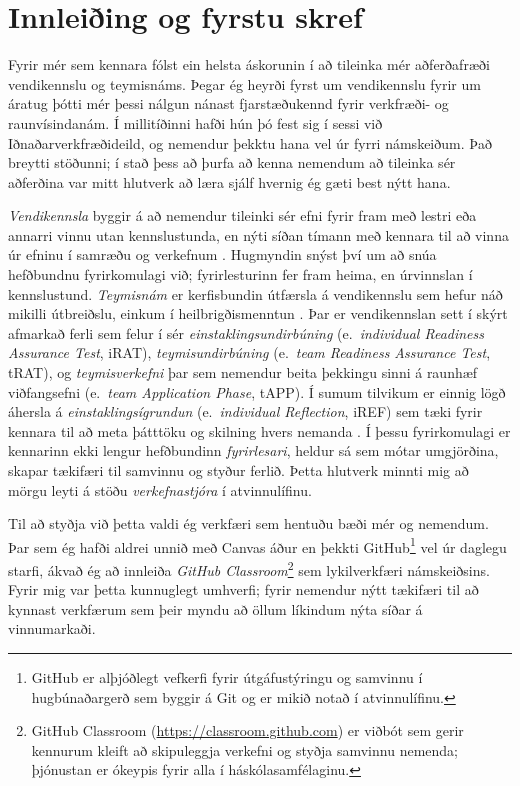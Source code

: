 \documentclass{article}
\begin{document}
\section*{Innleiðing og fyrstu skref}
Fyrir mér sem kennara fólst ein helsta áskorunin í að tileinka mér aðferðafræði vendikennslu og teymisnáms. Þegar ég heyrði fyrst um vendikennslu fyrir um áratug þótti mér þessi nálgun nánast fjarstæðukennd fyrir verkfræði- og raunvísindanám. Í millitíðinni hafði hún þó fest sig í sessi við Iðnaðarverkfræðideild, og nemendur þekktu hana vel úr fyrri námskeiðum. Það breytti stöðunni; í stað þess að þurfa að kenna nemendum að tileinka sér aðferðina var mitt hlutverk að læra sjálf hvernig ég gæti best nýtt hana.

\textit{Vendikennsla} byggir á að nemendur tileinki sér efni fyrir fram með lestri eða annarri vinnu utan kennslustunda, en nýti síðan tímann með kennara til að vinna úr efninu í samræðu og verkefnum \citep{tucker2012flipped}. Hugmyndin snýst því um að snúa hefðbundnu fyrirkomulagi við; fyrirlesturinn fer fram heima, en úrvinnslan í kennslustund.
\textit{Teymisnám} er kerfisbundin útfærsla á vendikennslu sem hefur náð mikilli útbreiðslu, einkum í heilbrigðismenntun \citep{michaelsen2004team}. Þar er vendikennslan sett í skýrt afmarkað ferli sem felur í sér \textit{einstaklingsundirbúning} (e.~\textit{individual Readiness Assurance Test}, iRAT), \textit{teymisundirbúning} (e.~\textit{team Readiness Assurance Test}, tRAT), og \textit{teymisverkefni} þar sem nemendur beita þekkingu sinni á raunhæf viðfangsefni (e.~\textit{team Application Phase}, tAPP). Í sumum tilvikum er einnig lögð áhersla á \textit{einstaklingsígrundun} (e.~\textit{individual Reflection}, iREF)
sem tæki fyrir kennara til að meta þátttöku og skilning hvers nemanda \citep{fink2003creating,sibley2014getting}.
Í þessu fyrirkomulagi er kennarinn ekki lengur hefðbundinn \textit{fyrirlesari}, heldur sá sem mótar umgjörðina, skapar tækifæri til samvinnu og styður ferlið. Þetta hlutverk minnti mig að mörgu leyti á stöðu \textit{verkefnastjóra} í atvinnulífinu.

Til að styðja við þetta valdi ég verkfæri sem hentuðu bæði mér og nemendum. Þar sem ég hafði aldrei unnið með Canvas áður en þekkti GitHub\footnote{GitHub er alþjóðlegt vefkerfi fyrir útgáfustýringu og samvinnu í hugbúnaðargerð sem byggir á Git og er mikið notað í atvinnulífinu.} vel úr daglegu starfi, ákvað ég að innleiða \textit{GitHub Classroom}\footnote{GitHub Classroom (\url{https://classroom.github.com}) er viðbót sem gerir kennurum kleift að skipuleggja verkefni og styðja samvinnu nemenda; þjónustan er ókeypis fyrir alla í háskólasamfélaginu.} 
sem lykilverkfæri námskeiðsins. Fyrir mig var þetta kunnuglegt umhverfi; fyrir nemendur nýtt tækifæri til að kynnast verkfærum sem þeir myndu að öllum líkindum nýta síðar á vinnumarkaði.
\end{document}
